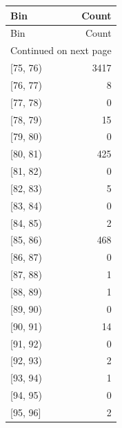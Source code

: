 \begin{longtable}{lr}
\toprule
Bin & Count \\
\midrule
\endfirsthead
\toprule
Bin & Count \\
\midrule
\endhead
\midrule
\multicolumn{2}{r}{Continued on next page} \\
\midrule
\endfoot
\bottomrule
\endlastfoot
{[75, 76)} & 3417 \\
{[76, 77)} & 8 \\
{[77, 78)} & 0 \\
{[78, 79)} & 15 \\
{[79, 80)} & 0 \\
{[80, 81)} & 425 \\
{[81, 82)} & 0 \\
{[82, 83)} & 5 \\
{[83, 84)} & 0 \\
{[84, 85)} & 2 \\
{[85, 86)} & 468 \\
{[86, 87)} & 0 \\
{[87, 88)} & 1 \\
{[88, 89)} & 1 \\
{[89, 90)} & 0 \\
{[90, 91)} & 14 \\
{[91, 92)} & 0 \\
{[92, 93)} & 2 \\
{[93, 94)} & 1 \\
{[94, 95)} & 0 \\
{[95, 96]} & 2 \\
\end{longtable}
